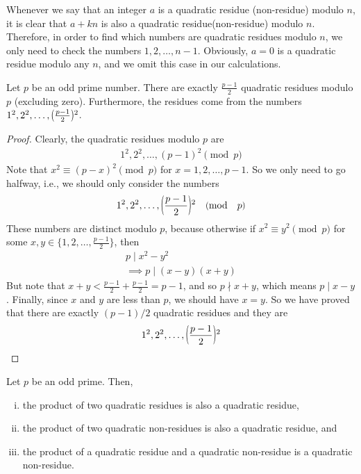 \documentclass[main.tex]{subfile}
\begin{document}
	\begin{note}
		Whenever we say that an integer $a$ is a quadratic residue (non-residue) modulo $n$, it is clear that $a+kn$ is also a quadratic residue(non-residue) modulo $n$. Therefore, in order to find which numbers are quadratic residues modulo $n$, we only need to check the numbers $1, 2, \ldots, n-1$. Obviously, $a=0$ is a quadratic residue modulo any $n$, and we omit this case in our calculations.
	\end{note}

	\begin{theorem}\label{thm:primeresidue}
		Let $p$ be an odd prime number. There are exactly $\displaystyle \frac{p-1}{2}$ quadratic residues modulo $p$ (excluding zero). Furthermore, the residues come from the numbers $1^2, 2^2, \ldots, \parenthesis{\frac{p-1}{2}}^2$.
	\end{theorem}

	\begin{proof}
		Clearly, the quadratic residues modulo $p$ are
		\begin{align*}
			1^2, 2^2, \ldots, (p-1)^2 \pmod p
		\end{align*}
		Note that $x^2 \equiv (p-x)^2 \pmod p$ for $x=1,2,\ldots,p-1$. So we only need to go halfway, i.e., we should only consider the numbers
		\begin{align*}
			1^2, 2^2, \ldots, \parenthesis{\frac{p-1}{2}}^2 \pmod p
		\end{align*}
		These numbers are distinct modulo $p$, because otherwise if $x^2 \equiv y^2 \pmod p$ for some $x,y \in \{1,2,\ldots,\frac{p-1}{2}\}$, then
		\begin{align*}
			p\mid x^2 -y^2\\
			\implies p\mid (x-y)(x+y)
		\end{align*}
		But note that $x+y< \frac{p-1}{2}+\frac{p-1}{2}=p-1$, and so $p \nmid x+y$, which means $p\mid x-y$. Finally, since $x$ and $y$ are less than $p$, we should have $x=y$.
		So we have proved that there are exactly $(p-1)/2$ quadratic residues and they are
		\begin{align*}
			1^2, 2^2, \ldots, \parenthesis{\frac{p-1}{2}}^2
		\end{align*}
	\end{proof}

	\begin{theorem}\label{thm:qrnr}
		Let $p$ be an odd prime. Then,
		\begin{enumerate}[(i)]
			\item the product of two quadratic residues is also a quadratic residue,
			\item the product of two quadratic non-residues is also a quadratic residue, and
			\item the product of a quadratic residue and a quadratic non-residue is a quadratic non-residue.
		\end{enumerate}
	\end{theorem}
\end{document}
